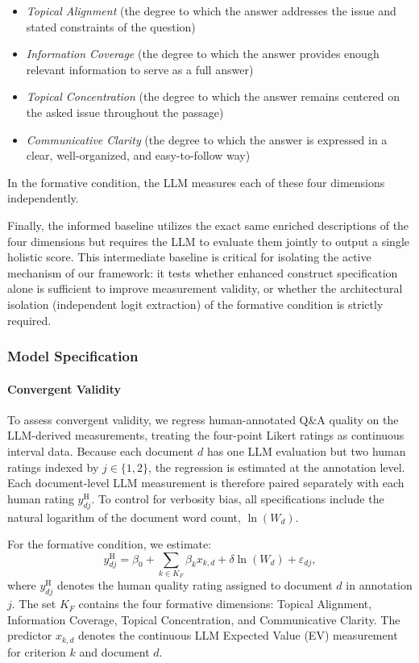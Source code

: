 \begin{itemize}
    \item \textit{Topical Alignment} (the degree to which the answer addresses the issue and stated constraints of the question)
    \item \textit{Information Coverage} (the degree to which the answer provides enough relevant information to serve as a full answer)
    \item \textit{Topical Concentration} (the degree to which the answer remains centered on the asked issue throughout the passage)
    \item \textit{Communicative Clarity} (the degree to which the answer is expressed in a clear, well-organized, and easy-to-follow way)
\end{itemize}
In the formative condition, the LLM measures each of these four dimensions independently.

Finally, the informed baseline utilizes the exact same enriched descriptions of the four dimensions but requires the LLM to evaluate them jointly to output a single holistic score. This intermediate baseline is critical for isolating the active mechanism of our framework: it tests whether enhanced construct specification alone is sufficient to improve measurement validity, or whether the architectural isolation (independent logit extraction) of the formative condition is strictly required.

\subsubsection{Model Specification}

\paragraph{Convergent Validity}

To assess convergent validity, we regress human-annotated Q\&A quality on the LLM-derived measurements, treating the four-point Likert ratings as continuous interval data. Because each document $d$ has one LLM evaluation but two human ratings indexed by $j \in \{1,2\}$, the regression is estimated at the annotation level. Each document-level LLM measurement is therefore paired separately with each human rating $y^{\text{H}}_{dj}$. To control for verbosity bias, all specifications include the natural logarithm of the document word count, $\ln(W_d)$.

For the formative condition, we estimate:
\begin{equation}\label{eq:feedbackqa_formative_regression}
    y^{\text{H}}_{dj} = \beta_0 + \sum_{k \in K_F} \beta_k x_{k,d} + \delta \ln(W_d) + \varepsilon_{dj},
\end{equation}
where $y^{\text{H}}_{dj}$ denotes the human quality rating assigned to document $d$ in annotation $j$. The set $K_F$ contains the four formative dimensions: Topical Alignment, Information Coverage, Topical Concentration, and Communicative Clarity. The predictor $x_{k,d}$ denotes the continuous LLM Expected Value (EV) measurement for criterion $k$ and document $d$.

